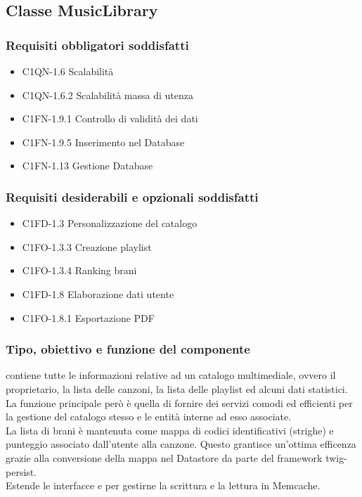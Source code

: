\subsection{Classe MusicLibrary}
\subsubsection*{Requisiti obbligatori soddisfatti}
\begin{itemize}
	\item C1QN-1.6 Scalabilit\`a
	\item C1QN-1.6.2 Scalabilit\`a massa di utenza
	\item C1FN-1.9.1 Controllo di validit\`a dei dati
	\item C1FN-1.9.5 Inserimento nel Database
	\item C1FN-1.13 Gestione Database
\end{itemize}
\subsubsection*{Requisiti desiderabili e opzionali soddisfatti}
\begin{itemize}
    \item C1FD-1.3 Personalizzazione del catalogo
    \item C1FO-1.3.3 Creazione playlist 
    \item C1FO-1.3.4 Ranking brani
    \item C1FD-1.8 Elaborazione dati utente
    \item C1FO-1.8.1 Esportazione PDF
\end{itemize}
\subsubsection*{Tipo, obiettivo e funzione del componente} 
contiene tutte le informazioni relative ad un catalogo multimediale, ovvero
il proprietario, la lista delle canzoni, la lista delle playlist ed alcuni dati
statistici. La funzione principale per\`o \`e quella di fornire dei servizi comodi ed efficienti per la gestione del catalogo
stesso e le entit\`a interne ad esso associate.\\
La lista di brani \`e mantenuta
come mappa di codici identificativi (strighe) e punteggio associato
dall'utente alla canzone. Questo grantisce un'ottima efficenza grazie alla
conversione della mappa nel Datastore da parte del framework twig-persist.\\
Estende le interfacce 
e  per gestirne la scrittura e la
lettura in Memcache.
